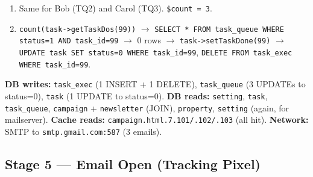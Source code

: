 \documentclass[11pt,a4paper]{article}
\begin{document}
\begin{enumerate}[leftmargin=1.6em,itemsep=2pt]
\begin{itemize}[itemsep=2pt]
                \texttt{Host='smtp.gmail.com'},
                \texttt{Port=587}, \texttt{SMTPSecure='tls'},
                \texttt{Username='marketing@shop.example'},
                \texttt{Password=base64\_decode('app-password')},
                \texttt{SMTPAuth=true}.
          \item \texttt{AddAddress('alice@x.com', 'Alice')},
                \texttt{IsHTML(true)},
                \texttt{SetFrom('marketing@shop.example', 'NecoShop')},
                \texttt{AddReplyTo('reply@shop.example', 'NecoShop')},
                \texttt{Subject='Spring Sale Now On'},
                \texttt{Body=\$htmlbody}.
          \item \texttt{Send()} $\to$ SMTP to
                \texttt{smtp.gmail.com:587}, STARTTLS, AUTH LOGIN,
                MAIL FROM, RCPT TO \texttt{alice@x.com}, DATA
                (sends the email with the tracking pixel and
                rewritten link). Returns true.
          \item \texttt{ClearAllRecipients()}.
          \item \texttt{task->setQueueDone(key)} $\to$
                \texttt{UPDATE task\_queue SET status=0 WHERE
                task\_queue\_id=<TQ1>}.
        \end{itemize}
  \item Same for Bob (TQ2) and Carol (TQ3). \texttt{\$count = 3}.
  \item \texttt{count(task->getTaskDos(99))} $\to$
        \texttt{SELECT * FROM task\_queue WHERE status=1 AND
        task\_id=99} $\to$ 0 rows $\to$
        \texttt{task->setTaskDone(99)} $\to$
        \texttt{UPDATE task SET status=0 WHERE task\_id=99},
        \texttt{DELETE FROM task\_exec WHERE task\_id=99}.
\end{enumerate}

\textbf{DB writes:} \texttt{task\_exec} (1 INSERT + 1 DELETE),
\texttt{task\_queue} (3 UPDATEs to status=0), \texttt{task} (1
UPDATE to status=0). \textbf{DB reads:} \texttt{setting},
\texttt{task}, \texttt{task\_queue}, \texttt{campaign} +
\texttt{newsletter} (JOIN), \texttt{property},
\texttt{setting} (again, for mailserver). \textbf{Cache reads:}
\texttt{campaign.html.7.101/.102/.103} (all hit).
\textbf{Network:} SMTP to \texttt{smtp.gmail.com:587} (3 emails).

\subsection{Stage 5 --- Email Open (Tracking Pixel)}
\end{document}
